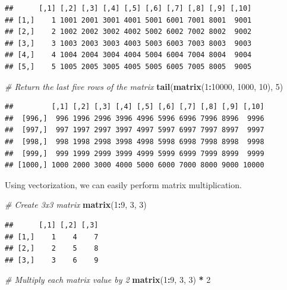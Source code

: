 \documentclass[]{book}
\newenvironment{Shaded}{\begin{snugshade}}{\end{snugshade}}
\newcommand{\CommentTok}[1]{\textcolor[rgb]{0.56,0.35,0.01}{\textit{#1}}}
\newcommand{\DecValTok}[1]{\textcolor[rgb]{0.00,0.00,0.81}{#1}}
\newcommand{\KeywordTok}[1]{\textcolor[rgb]{0.13,0.29,0.53}{\textbf{#1}}}
\newcommand{\NormalTok}[1]{#1}
\newcommand{\OperatorTok}[1]{\textcolor[rgb]{0.81,0.36,0.00}{\textbf{#1}}}
\newcommand{\StringTok}[1]{\textcolor[rgb]{0.31,0.60,0.02}{#1}}
\begin{document}
\begin{verbatim}
##      [,1] [,2] [,3] [,4] [,5] [,6] [,7] [,8] [,9] [,10]
## [1,]    1 1001 2001 3001 4001 5001 6001 7001 8001  9001
## [2,]    2 1002 2002 3002 4002 5002 6002 7002 8002  9002
## [3,]    3 1003 2003 3003 4003 5003 6003 7003 8003  9003
## [4,]    4 1004 2004 3004 4004 5004 6004 7004 8004  9004
## [5,]    5 1005 2005 3005 4005 5005 6005 7005 8005  9005
\end{verbatim}

\begin{Shaded}
\begin{Highlighting}[]
\CommentTok{# Return the last five rows of the matrix}
\KeywordTok{tail}\NormalTok{(}\KeywordTok{matrix}\NormalTok{(}\DecValTok{1}\OperatorTok{:}\DecValTok{10000}\NormalTok{, }\DecValTok{1000}\NormalTok{, }\DecValTok{10}\NormalTok{), }\DecValTok{5}\NormalTok{)}
\end{Highlighting}
\end{Shaded}

\begin{verbatim}
##         [,1] [,2] [,3] [,4] [,5] [,6] [,7] [,8] [,9] [,10]
##  [996,]  996 1996 2996 3996 4996 5996 6996 7996 8996  9996
##  [997,]  997 1997 2997 3997 4997 5997 6997 7997 8997  9997
##  [998,]  998 1998 2998 3998 4998 5998 6998 7998 8998  9998
##  [999,]  999 1999 2999 3999 4999 5999 6999 7999 8999  9999
## [1000,] 1000 2000 3000 4000 5000 6000 7000 8000 9000 10000
\end{verbatim}

Using vectorization, we can easily perform matrix multiplication.

\begin{Shaded}
\begin{Highlighting}[]
\CommentTok{# Create 3x3 matrix}
\KeywordTok{matrix}\NormalTok{(}\DecValTok{1}\OperatorTok{:}\DecValTok{9}\NormalTok{, }\DecValTok{3}\NormalTok{, }\DecValTok{3}\NormalTok{)}
\end{Highlighting}
\end{Shaded}

\begin{verbatim}
##      [,1] [,2] [,3]
## [1,]    1    4    7
## [2,]    2    5    8
## [3,]    3    6    9
\end{verbatim}

\begin{Shaded}
\begin{Highlighting}[]
\CommentTok{# Multiply each matrix value by 2}
\KeywordTok{matrix}\NormalTok{(}\DecValTok{1}\OperatorTok{:}\DecValTok{9}\NormalTok{, }\DecValTok{3}\NormalTok{, }\DecValTok{3}\NormalTok{) }\OperatorTok{*}\StringTok{ }\DecValTok{2}
\end{Highlighting}
\end{Shaded}
\end{document}
